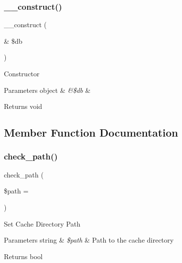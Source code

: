 \subsubsection{\texorpdfstring{\+\_\+\+\_\+construct()}{\_\_construct()}}
{\footnotesize\ttfamily \+\_\+\+\_\+construct (\begin{DoxyParamCaption}\item[{\&}]{\$db }\end{DoxyParamCaption})}

Constructor


\begin{DoxyParams}[1]{Parameters}
object & {\em \&\$db} & \\
\hline
\end{DoxyParams}
\begin{DoxyReturn}{Returns}
void 
\end{DoxyReturn}


\subsection{Member Function Documentation}
\mbox{\label{class_c_i___d_b___cache_adb73b6f91025d00c565d228c4f611f41}} 
\subsubsection{\texorpdfstring{check\+\_\+path()}{check\_path()}}
{\footnotesize\ttfamily check\+\_\+path (\begin{DoxyParamCaption}\item[{}]{\$path = {\ttfamily \textquotesingle{}\textquotesingle{}} }\end{DoxyParamCaption})}

Set Cache Directory Path


\begin{DoxyParams}[1]{Parameters}
string & {\em \$path} & Path to the cache directory \\
\hline
\end{DoxyParams}
\begin{DoxyReturn}{Returns}
bool 
\end{DoxyReturn}
\mbox{\label{class_c_i___d_b___cache_ab97f36d9c24db4b2e91c9e02342cc994}} 
